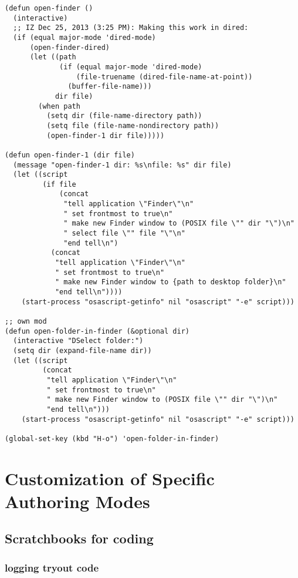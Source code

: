\documentclass[nofonts]{tufte-handout}
\begin{document}
\begin{verbatim}
(defun open-finder ()
  (interactive)
  ;; IZ Dec 25, 2013 (3:25 PM): Making this work in dired:
  (if (equal major-mode 'dired-mode)
      (open-finder-dired)
      (let ((path
             (if (equal major-mode 'dired-mode)
                 (file-truename (dired-file-name-at-point))
               (buffer-file-name)))
            dir file)
        (when path
          (setq dir (file-name-directory path))
          (setq file (file-name-nondirectory path))
          (open-finder-1 dir file)))))

(defun open-finder-1 (dir file)
  (message "open-finder-1 dir: %s\nfile: %s" dir file)
  (let ((script
         (if file
             (concat
              "tell application \"Finder\"\n"
              " set frontmost to true\n"
              " make new Finder window to (POSIX file \"" dir "\")\n"
              " select file \"" file "\"\n"
              "end tell\n")
           (concat
            "tell application \"Finder\"\n"
            " set frontmost to true\n"
            " make new Finder window to {path to desktop folder}\n"
            "end tell\n"))))
    (start-process "osascript-getinfo" nil "osascript" "-e" script)))

;; own mod
(defun open-folder-in-finder (&optional dir)
  (interactive "DSelect folder:")
  (setq dir (expand-file-name dir))
  (let ((script
         (concat
          "tell application \"Finder\"\n"
          " set frontmost to true\n"
          " make new Finder window to (POSIX file \"" dir "\")\n"
          "end tell\n")))
    (start-process "osascript-getinfo" nil "osascript" "-e" script)))

(global-set-key (kbd "H-o") 'open-folder-in-finder)
\end{verbatim}

\section{Customization of Specific Authoring Modes}
\label{sec-2}

\subsection{Scratchbooks for coding}
\label{sec-2-1}
\subsubsection{logging tryout code}
\label{sec-2-1-1}
\end{document}

